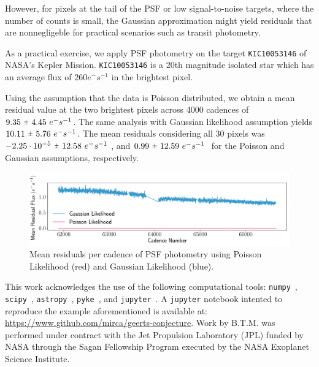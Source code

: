 \documentclass{rnaastex}
\newcommand{\rpm}{\sbox0{$1$}\sbox2{$\scriptstyle\pm$}
\raise\dimexpr(\ht0-\ht2)/2\relax\box2 }
\begin{document}
However, for pixels at the tail of the PSF or low signal-to-noise targets,
where the number of counts is small, the Gaussian approximation might
yield residuals that are nonnegligeble for practical scenarios such as transit
photometry.

As a practical exercise, we apply PSF photometry on the target
\texttt{KIC10053146} of NASA's Kepler Mission. \texttt{KIC10053146} is a
20th magnitude isolated star which has an average flux of $260 e^{-}s^{-1}$ in
the brightest pixel.

Using the assumption that the data is Poisson distributed, we obtain a mean
residual value at the two brightest pixels across 4000 cadences of
$9.35~\rpm~4.45~e^{-}s^{-1}$. The same analysis with Gaussian likelihood
assumption yields $10.11~\rpm~5.76~e^{-}s^{-1}$. The mean residuals
considering all 30 pixels was $-2.25\cdot 10^{-5}~\rpm~12.58~e^{-}s^{-1}~$,
and $0.99~\rpm~12.59~e^{-}s^{-1}~$ for the Poisson and Gaussian assumptions,
respectively.

\begin{figure}[!htb]
    \centering
    \includegraphics[scale=.5]{comparison.pdf}
    \caption{Mean residuals per cadence of PSF photometry using Poisson
             Likelihood (red) and Gaussian Likelihood (blue).}
\end{figure}

\acknowledgments This work acknowledges the use of the following computational
tools: \texttt{numpy}~\citep{numpy}, \texttt{scipy}~\citep{scipy},
\texttt{astropy}~\citep{astropy}, \texttt{pyke}~\citep{pyke},
and \texttt{jupyter}~\citep{jupyter}.
A \texttt{jupyter} notebook intented to reproduce the example aforementioned is
available at: \url{https://www.github.com/mirca/geerts-conjecture}.
Work by B.T.M. was performed under contract with the Jet Propulsion Laboratory (JPL) funded by 
NASA through the Sagan Fellowship Program executed by the NASA Exoplanet Science Institute.
\end{document}
